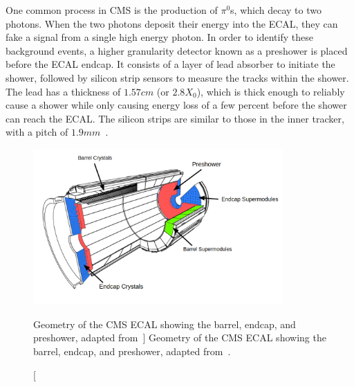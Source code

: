 One common process in CMS is the production of $\pi^0$s, which decay to two photons. When the two photons deposit their energy into the ECAL, they can fake a signal from a single high energy photon. In order to identify these background events, a higher granularity detector known as a preshower is placed before the ECAL endcap. It consists of a layer of lead absorber to initiate the shower, followed by silicon strip sensors to measure the tracks within the shower. The lead has a thickness of $1.57\unit{cm}$ (or $2.8X_0$), which is thick enough to reliably cause a shower while only causing energy loss of a few percent before the shower can reach the ECAL. The silicon strips are similar to those in the inner tracker, with a pitch of $1.9\unit{mm}$~\cite{TOURNEFIER2001355}.

\begin{figure}[htpb]
	\centering
	\includegraphics[width=0.85\textwidth]{figs/03_experiment/cms_ecal.pdf}
	\caption
	[Geometry of the CMS ECAL showing the barrel, endcap, and preshower, adapted from~\cite{Marzocchi2019}]
	{Geometry of the CMS ECAL showing the barrel, endcap, and preshower, adapted from~\cite{Marzocchi2019}.}
	\label{fig:ecal}
\end{figure}


